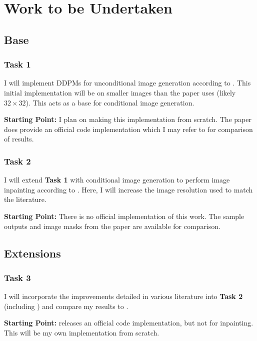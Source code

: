\documentclass{article}
\begin{document}
\newpage
\section{Work to be Undertaken}

\subsection{Base}

\subsubsection{Task 1}
I will implement DDPMs for unconditional image generation according to \cite{Ho-2020}. This initial implementation will be on smaller images than the paper uses (likely $32 \times 32$). This acts as a base for conditional image generation.

\noindent\textbf{Starting Point:} I plan on making this implementation from scratch. The paper does provide an official code implementation which I may refer to for comparison of results.

\subsubsection{Task 2}
I will extend \textbf{Task 1} with conditional image generation to perform image inpainting according to \cite{Saharia-2022}. Here, I will increase the image resolution used to match the literature.

\noindent\textbf{Starting Point:} There is no official implementation of this work. The sample outputs and image masks from the paper are available for comparison.

\subsection{Extensions}

\subsubsection{Task 3}
I will incorporate the improvements detailed in various literature into \textbf{Task 2} (including \cite{Nichol-2021}) and compare my results to \cite{Saharia-2022}.

\noindent\textbf{Starting Point:} \cite{Saharia-2022} releases an official code implementation, but not for inpainting. This will be my own implementation from scratch.
\end{document}
